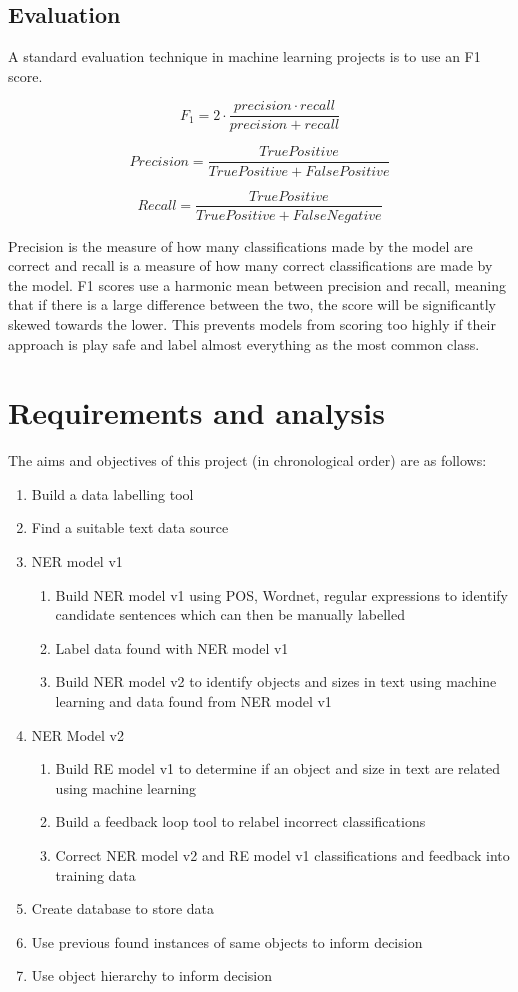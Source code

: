 \documentclass[11pt,oneside]{book}
\begin{document}
\section{Evaluation}
A standard evaluation technique in machine learning projects is to use an F1 score.

\[ F_1 = 2 \cdot \frac{precision \cdot recall}{precision + recall} \]

\[ Precision = \frac{True Positive}{True Positive + False Positive} \]

\[ Recall = \frac{True Positive}{True Positive + False Negative} \]

Precision is the measure of how many classifications made by the model are correct and recall is a measure of how many correct classifications are made by the model. F1 scores use a harmonic mean between precision and recall, meaning that if there is a large difference between the two, the score will be significantly skewed towards the lower. This prevents models from scoring too highly if their approach is play safe and label almost everything as the most common class.

\chapter{Requirements and analysis}

The aims and objectives of this project (in chronological order) are as follows:

\begin{enumerate}
\item Build a data labelling tool
\item Find a suitable text data source
\item NER model v1
\begin{enumerate}
\item Build NER model v1 using POS, Wordnet, regular expressions to identify candidate sentences which can then be manually labelled
\item Label data found with NER model v1
\item Build NER model v2 to identify objects and sizes in text using machine learning and data found from NER model v1
\end{enumerate}
\item NER Model v2
\begin{enumerate}
\item Build RE model v1 to determine if an object and size in text are related using machine learning
\item Build a feedback loop tool to relabel incorrect classifications
\item Correct NER model v2 and RE model v1 classifications and feedback into training data
\end{enumerate}
\item Create database to store data
\item Use previous found instances of same objects to inform decision
\item Use object hierarchy to inform decision
\end{enumerate}
\end{document}
